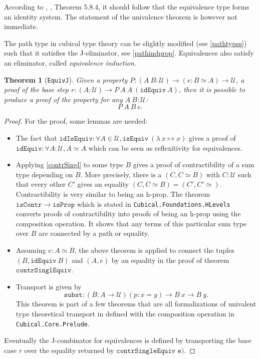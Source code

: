 \documentclass[12pt,a4paper,twoside,xetex]{book}
\newcommand{\keyword}[1]{\emph{#1}\index{#1}}
\newtheorem{theorem}{Theorem}[section]
\newcommand{\op}[1]{\mathtt{#1}}
\newcommand{\type}{\mathcal{U}}
\begin{document}
According to \cite{Huber2016}, \cite{Voevodsky2013}, Theorem 5.8.4, it should 
follow that the equivalence type forms an identity system. The statement of the 
univalence theorem is however not immediate.

The path type in cubical type theory can be slightly modified (see 
\cref{pathtypes}) such that it satisfies the J-eliminator, see 
\cref{pathindprop}. Equivalences also satisfy an eliminator, called 
\keyword{equivalence induction}. 

\begin{theorem}[\texttt{EquivJ}]
Given a property $P: (A \ B : \mathcal{U}) \rightarrow (e : B \simeq A) 
\rightarrow \mathcal{U}$, a proof of the base step $r : (A : \mathcal{U}) 
\rightarrow P \ A\ A \ (\texttt{idEquiv} \ A)$, then it is possible to produce 
a proof of the property for any $A \ B: \mathcal{U}$: $$ P\  A \ B\ e.$$
\end{theorem}

\begin{proof}

For the proof, some lemmas are needed: 
\begin{itemize}

\item The fact that  $\op{idIsEquiv}: \forall A \in \type , \op{isEquiv} \  
(\lambda \ x \mapsto x)$ gives a proof of  $\op{idEquiv}: \forall A : \type, A 
\simeq A$ which can be seen as reflexitivity for equivalences.

\item Applying \cref{contrSingl} to some type $B$ gives a proof of 
contractibility of a sum type depending on $B$. More precisely, there is a $(C, 
C \simeq B)$ with $C:\mathcal{U}$ such that every other $C'$ gives an equality 
$(C,C \simeq B) = (C',C'\simeq)$. Contractibility is very similar to being an 
h-prop. The theorem $\op{isContr} \rightarrow \op{isProp}$ which is stated in 
\texttt{Cubical.Foundations.HLevels} converts proofs of contractibility into 
proofs of being an h-prop using the composition operation. It shows that any 
terms of this particular sum type over $B$ are connected by a path or equality.


\item   Assuming $e : A \simeq B$, the above theorem is applied to connect the 
tuples $(B, \op{idEquiv} \ B)$ and $(A, e)$ by an equality in the proof of 
theorem $\op{contrSinglEquiv}$.

\item Transport is given by $$\op{subst} : \left(B : A \rightarrow \type 
\right) (p : x = y) \rightarrow B \ x \rightarrow B \ y.$$ This theorem is part 
of a few theorems that are all formalizations of univalent type theoretical 
transport in defined with the composition operation in 
\texttt{Cubical.Core.Prelude}.

\end{itemize}

Eventually the J-combinator for equivalences is defined by transporting the 
base case $r$ over the equality returned by $\texttt{contrSingleEquiv e)}$.

\end{proof}
\end{document}
